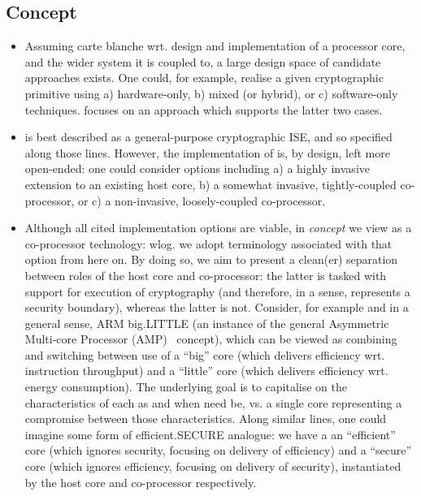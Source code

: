 \documentclass{article}
\begin{document}

\subsection*{Concept}

\begin{itemize}

\item Assuming carte blanche wrt. design and implementation of a processor 
      core, and the wider system it is coupled to, a large design space of 
      candidate approaches exists.  One could, for example, realise a given 
      cryptographic primitive using
      a) hardware-only,
      b) mixed (or hybrid),
         or
      c) software-only
      techniques.
      \ISE focuses on an approach which supports the latter two cases.

\item \ISE is best described as a general-purpose cryptographic ISE, and so
      specified along those lines.  However, the implementation of \ISE is,
      by design, left more open-ended: one could consider options including
      a) a highly   invasive extension to an existing host core,
      b) a somewhat invasive, tightly-coupled co-processor,
         or
      c) a      non-invasive, loosely-coupled co-processor.

\item Although all cited implementation options are viable, in {\em concept}
      we view \ISE as a co-processor technology: wlog. we adopt terminology 
      associated with that option from here on.
      By doing so, we aim to present a clean(er) separation between roles of
      the host core and \ISE co-processor: the latter is tasked with support
      for execution of cryptography (and therefore, in a sense, represents a 
      security boundary), whereas the latter is not.
      Consider, for example and in a general sense, ARM {\sf big.LITTLE}
      (an instance of the general Asymmetric Multi-core Processor (AMP)~\cite{SCARV:Mittal:16} concept),
      which can be viewed as combining and switching between
      use of
      a ``big''    core (which delivers efficiency wrt. instruction throughput)
      and 
      a ``little'' core (which delivers efficiency wrt. energy consumption).
      The underlying goal is to capitalise on the characteristics of each as 
      and when need be, vs. a single core representing a compromise between 
      those characteristics.  Along similar lines, one could imagine some
      form of {\sf efficient.SECURE} analogue: we have a 
      an ``efficient'' core (which ignores   security, focusing on delivery of efficiency)
      and
      a  ``secure''    core (which ignores efficiency, focusing on delivery of   security),
      instantiated by the host core and \ISE co-processor respectively.


\end{itemize}
\end{document}

